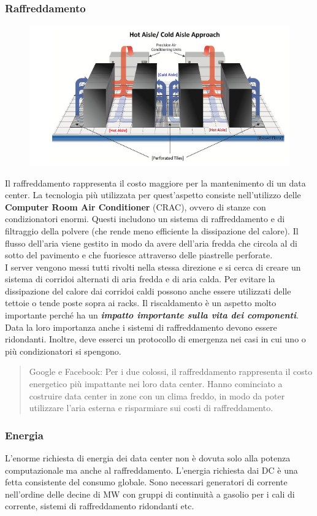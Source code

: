 \documentclass{article}
\begin{document}
		\subsubsection{Raffreddamento}\label{raffreddamento}
		\begin{figure}[ht]
			\centering
			\includegraphics[width=0.5\linewidth]{SAC_B7_cooling}
			\label{fig:sacb7cooling}
		\end{figure}
		
		Il raffreddamento rappresenta il costo maggiore	per la mantenimento di un data center. La tecnologia più utilizzata per quest'aspetto consiste nell'utilizzo delle \textbf{Computer
		Room Air Conditioner} (CRAC), ovvero di stanze con condizionatori enormi. Questi includono un sistema di raffreddamento e di filtraggio della polvere (che rende meno efficiente la dissipazione del calore). Il flusso dell'aria viene gestito in modo da avere dell'aria fredda che circola al di sotto del pavimento e che fuoriesce attraverso delle piastrelle perforate.\\
		I server vengono messi tutti rivolti nella stessa direzione e si cerca di creare un sistema di corridoi alternati di aria fredda e di aria calda. Per evitare la dissipazione del calore dai corridoi caldi possono anche essere utilizzati delle tettoie o tende poste sopra ai racks. Il riscaldamento è un aspetto molto importante perché ha un \textbf{\emph{impatto importante sulla vita dei componenti}}. Data la loro importanza anche i	sistemi di raffreddamento devono essere ridondanti. Inoltre, deve esserci un protocollo di emergenza nei casi in cui uno o più condizionatori si spengono.
		
		\begin{quote}
		Google e Facebook: Per i due colossi, il raffreddamento rappresenta il costo energetico più impattante nei loro data center. Hanno cominciato a costruire data center in	zone con un clima freddo, in modo da poter utilizzare l'aria esterna e risparmiare sui costi di raffreddamento.
		\end{quote}
		
		\subsubsection{Energia}
		L'enorme richiesta di energia dei data center non è dovuta solo alla potenza computazionale ma anche al raffreddamento. L'energia richiesta dai DC è una fetta consistente del consumo globale. Sono necessari generatori di corrente nell'ordine delle decine di MW con gruppi di continuità a gasolio per i cali di corrente, sistemi di raffreddamento ridondanti etc.
		
\end{document}
